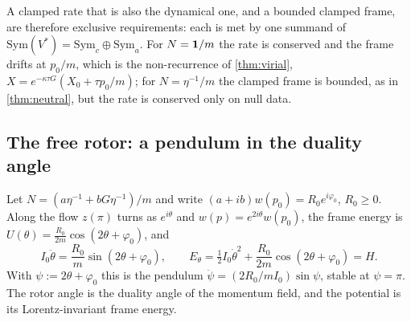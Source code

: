 A clamped rate that is also the dynamical one, and a bounded clamped frame, are therefore exclusive requirements: each is met by one summand of
$\mathrm{Sym}(V^*)=\mathrm{Sym}_c\oplus\mathrm{Sym}_a$. For $N=\mathbf 1/m$ the rate is conserved and the frame drifts at $p_0/m$, which is the
non-recurrence of \cref{thm:virial}, $X=e^{-\kappa\tau G}(X_0+\tau p_0/m)$; for $N=\eta^{-1}/m$ the clamped frame is bounded, as in \cref{thm:neutral},
but the rate is conserved only on null data.

\subsection{The free rotor: a pendulum in the duality angle}

\begin{theorem}
\label{thm:pendulum}
Let $N=(a\eta^{-1}+bG\eta^{-1})/m$ and write $(a+ib)w(p_0)=R_0e^{i\varphi_0}$, $R_0\ge0$. Along the flow $z(\pi)$ turns as $e^{i\theta}$ and
$w(p)=e^{2i\theta}w(p_0)$, the frame energy is $U(\theta)=\tfrac{R_0}{2m}\cos(2\theta+\varphi_0)$, and
\[
I_0\ddot\theta=\frac{R_0}m\sin(2\theta+\varphi_0),\qquad E_\theta=\tfrac12I_0\dot\theta^2+\frac{R_0}{2m}\cos(2\theta+\varphi_0)=H .
\]
With $\psi:=2\theta+\varphi_0$ this is the pendulum $\ddot\psi=(2R_0/mI_0)\sin\psi$, stable at $\psi=\pi$. The rotor angle is the duality angle of
the momentum field, and the potential is its Lorentz-invariant frame energy.
\end{theorem}

